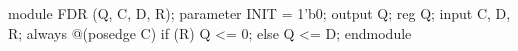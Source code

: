 \begin{vcode}
module FDR (Q, C, D, R);
    parameter INIT = 1'b0;
    output Q;
    reg    Q;
    input  C, D, R;
    always @(posedge C)
        if (R)
        Q <= 0;
        else
        Q <= D;
endmodule
\end{vcode}

